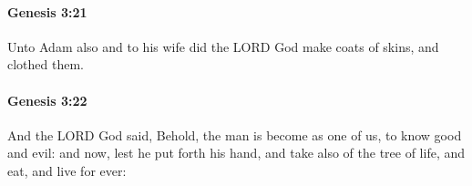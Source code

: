 		\paragraph{Genesis 3:21} %
			\label{GENESIS-3-21}

			Unto Adam also and to his wife did the LORD God make coats of skins, and clothed them.


		\paragraph{Genesis 3:22} %
			\label{GENESIS-3-22}

			And the LORD God said, Behold, the man is become as one of us, to know good and evil: and now, lest he put forth his hand, and take also of the tree of life, and eat, and live for ever:


